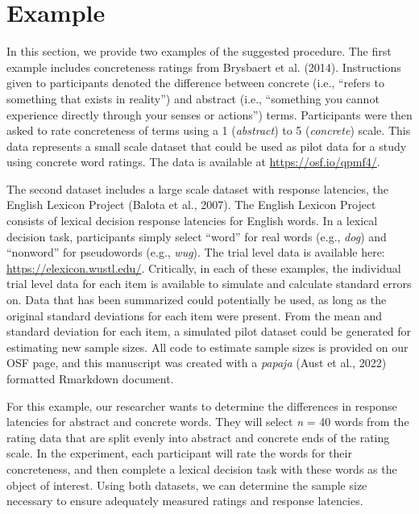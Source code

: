 \documentclass[
  man]{apa7}
\begin{document}
\hypertarget{example}{%
\section{Example}\label{example}}

In this section, we provide two examples of the suggested procedure. The first example includes concreteness ratings from Brysbaert et al. (2014). Instructions given to participants denoted the difference between concrete (i.e., ``refers to something that exists in reality'') and abstract (i.e., ``something you cannot experience directly through your senses or actions'') terms. Participants were then asked to rate concreteness of terms using a 1 (\emph{abstract}) to 5 (\emph{concrete}) scale. This data represents a small scale dataset that could be used as pilot data for a study using concrete word ratings. The data is available at \url{https://osf.io/qpmf4/}.

The second dataset includes a large scale dataset with response latencies, the English Lexicon Project (Balota et al., 2007). The English Lexicon Project consists of lexical decision response latencies for English words. In a lexical decision task, participants simply select ``word'' for real words (e.g., \emph{dog}) and ``nonword'' for pseudowords (e.g., \emph{wug}). The trial level data is available here: \url{https://elexicon.wustl.edu/}. Critically, in each of these examples, the individual trial level data for each item is available to simulate and calculate standard errors on. Data that has been summarized could potentially be used, as long as the original standard deviations for each item were present. From the mean and standard deviation for each item, a simulated pilot dataset could be generated for estimating new sample sizes. All code to estimate sample sizes is provided on our OSF page, and this manuscript was created with a \emph{papaja} (Aust et al., 2022) formatted Rmarkdown document.

For this example, our researcher wants to determine the differences in response latencies for abstract and concrete words. They will select \emph{n} = 40 words from the rating data that are split evenly into abstract and concrete ends of the rating scale. In the experiment, each participant will rate the words for their concreteness, and then complete a lexical decision task with these words as the object of interest. Using both datasets, we can determine the sample size necessary to ensure adequately measured ratings and response latencies.
\end{document}
